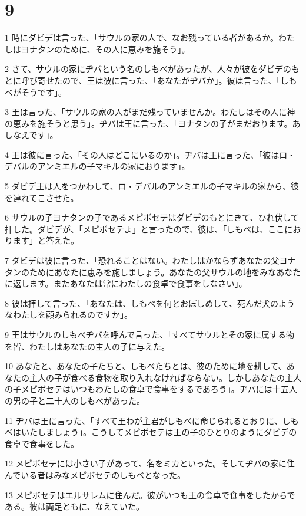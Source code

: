 \chapter{9}

\par 1 時にダビデは言った、「サウルの家の人で、なお残っている者があるか。わたしはヨナタンのために、その人に恵みを施そう」。
\par 2 さて、サウルの家にヂバという名のしもべがあったが、人々が彼をダビデのもとに呼び寄せたので、王は彼に言った、「あなたがヂバか」。彼は言った、「しもべがそうです」。
\par 3 王は言った、「サウルの家の人がまだ残っていませんか。わたしはその人に神の恵みを施そうと思う」。ヂバは王に言った、「ヨナタンの子がまだおります。あしなえです」。
\par 4 王は彼に言った、「その人はどこにいるのか」。ヂバは王に言った、「彼はロ・デバルのアンミエルの子マキルの家におります」。
\par 5 ダビデ王は人をつかわして、ロ・デバルのアンミエルの子マキルの家から、彼を連れてこさせた。
\par 6 サウルの子ヨナタンの子であるメピボセテはダビデのもとにきて、ひれ伏して拝した。ダビデが、「メピボセテよ」と言ったので、彼は、「しもべは、ここにおります」と答えた。
\par 7 ダビデは彼に言った、「恐れることはない。わたしはかならずあなたの父ヨナタンのためにあなたに恵みを施しましょう。あなたの父サウルの地をみなあなたに返します。またあなたは常にわたしの食卓で食事をしなさい」。
\par 8 彼は拝して言った、「あなたは、しもべを何とおぼしめして、死んだ犬のようなわたしを顧みられるのですか」。
\par 9 王はサウルのしもべヂバを呼んで言った、「すべてサウルとその家に属する物を皆、わたしはあなたの主人の子に与えた。
\par 10 あなたと、あなたの子たちと、しもべたちとは、彼のために地を耕して、あなたの主人の子が食べる食物を取り入れなければならない。しかしあなたの主人の子メピボセテはいつもわたしの食卓で食事をするであろう」。ヂバには十五人の男の子と二十人のしもべがあった。
\par 11 ヂバは王に言った、「すべて王わが主君がしもべに命じられるとおりに、しもべはいたしましょう」。こうしてメピボセテは王の子のひとりのようにダビデの食卓で食事をした。
\par 12 メピボセテには小さい子があって、名をミカといった。そしてヂバの家に住んでいる者はみなメピボセテのしもべとなった。
\par 13 メピボセテはエルサレムに住んだ。彼がいつも王の食卓で食事をしたからである。彼は両足ともに、なえていた。

